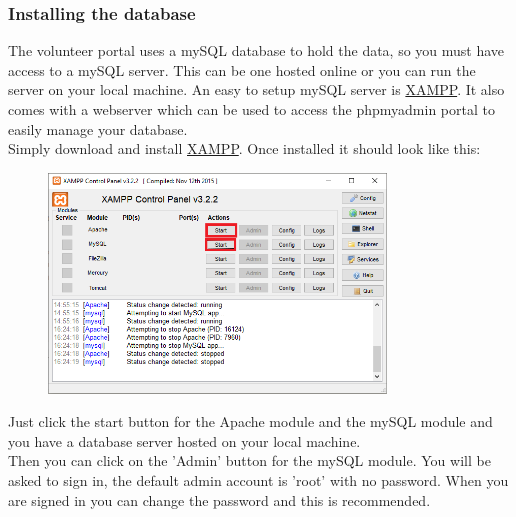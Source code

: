 \documentclass[12pt]{article}
\begin{document}
\subsubsection{Installing the database}
The volunteer portal uses a mySQL database to hold the data, so you must have access to a mySQL server. This can be one hosted online or you can run the server on your local machine. An easy to setup mySQL server is \href{https://www.apachefriends.org/index.html}{XAMPP}. It also comes with a webserver which can be used to access the phpmyadmin portal to easily manage your database.\\

\noindent
Simply download and install \href{https://www.apachefriends.org/index.html}{XAMPP}. Once installed it should look like this:
\begin{figure}[H]
    \centering
    \includegraphics[width=0.8\textwidth]{serversetup/start.png}
\end{figure}
\noindent
Just click the start button for the Apache module and the mySQL module and you have a database server hosted on your local machine. \\

\noindent
Then you can click on the 'Admin' button for the mySQL module. You will be asked to sign in, the default admin account is 'root' with no password. When you are signed in you can change the password and this is recommended.\\
\end{document}

